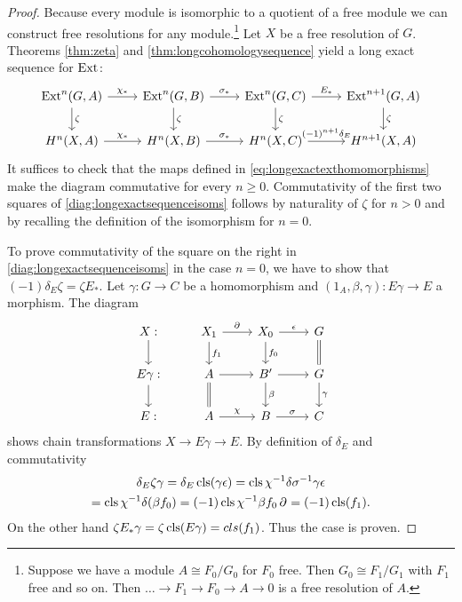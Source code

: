 \begin{proof}
Because every module is isomorphic to a quotient of a free module \cite[Proposition I.5.3.]{maclane} we can construct free resolutions for any module.\footnote{Suppose we have a module $A\cong F_0/G_0$ for $F_0$ free. Then $G_0\cong F_1/G_1$ with $F_1$ free and so on. Then $\dots \to F_1\to F_0 \to A \to 0$ is a free resolution of $A$.}
Let $X$ be a free resolution of $G$.
Theorems \ref{thm:zeta} and \ref{thm:longcohomologysequence} yield a long exact sequence for $\operatorname{Ext}^{}$:
\begin{equation}
\begin{tikzcd}
\label{diag:longexactsequenceisoms}
\Ext{n}(G,A) \arrow{r}{\chi_*} \arrow{d}{\zeta}&
\Ext{n}(G,B) \arrow{r}{\sigma_*} \arrow{d}{\zeta}&
\Ext{n}(G,C) \arrow{r}{E_*} \arrow{d}{\zeta}&
\Ext{n+1}(G,A) \arrow{d}{\zeta}
\\
H^{n}(X,A) \arrow{r}{\chi_*} &
H^{n}(X,B) \arrow{r}{\sigma_*} &
H^{n}(X,C) \arrow{r}{(-1)^{n+1}\delta_E} &
H^{n+1}(X,A) 
\end{tikzcd}
\end{equation}
It suffices to check that the maps defined in \eqref{eq:longexactexthomomorphisms} make the diagram commutative for every $n \geq 0$.
Commutativity of the first two squares of \eqref{diag:longexactsequenceisoms} follows by naturality of $\zeta$ for $n > 0$ and by recalling the definition of the isomorphism for $n=0$.

To prove commutativity of the square on the right in \eqref{diag:longexactsequenceisoms} in the case $n=0$, we have to show that
$(-1)\delta_E \zeta = \zeta E_*$.
Let $\gamma:G \to C$ be a homomorphism and $(1_A,\beta,\gamma):E\gamma\to E$ a morphism.
The diagram 
\begin{equation*}
\begin{tikzcd}
X:\arrow{d}&
X_1 
	\arrow{r}{\bdd{}}
	\arrow{d}{f_1} &
X_0 
	\arrow{r}{\epsilon}
	\arrow{d}{f_0} &
G
	\arrow[equal]{d} 
\\
E\gamma:\arrow{d}&
A
	\arrow{r} 
	\arrow[equal]{d} &
B'
	\arrow{r} 
	\arrow{d}{\beta}&
G
	\arrow{d}{\gamma}
\\
E:&
A
	\arrow{r}{\chi} &
B
	\arrow{r}{\sigma} &
C
\end{tikzcd}
\end{equation*}
shows chain transformations $X\to E\gamma \to E$.
By definition of $\delta_E$ and commutativity
\begin{multline*}
\delta_E \zeta \gamma 
= \delta_E \operatorname{cls}(\gamma \epsilon)
= \operatorname{cls} \chi^{-1} \delta \sigma ^{-1} \gamma \epsilon
\\= \operatorname{cls} \chi^{-1} \delta (\beta f_0)
= (-1) \operatorname{cls} \chi^{-1} \beta f_0 \operatorname{\partial}_{}
= (-1) \operatorname{cls} (f_1).
\end{multline*}
On the other hand $\zeta E_* \gamma = \zeta \operatorname{cls}(E\gamma) = cls(f_1)$.
Thus the case is proven.


\end{proof}
